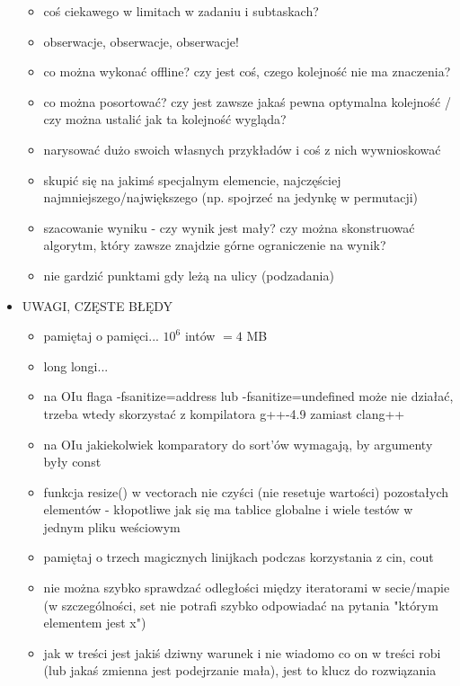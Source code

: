 \documentclass[15pt]{article}
\begin{document}
\begin{itemize}
\begin{itemize}
        \item coś ciekawego w limitach w zadaniu i subtaskach?
        \item obserwacje, obserwacje, obserwacje!
        \item co można wykonać offline? czy jest coś, czego kolejność nie ma znaczenia?
	    \item co można posortować? czy jest zawsze jakaś pewna optymalna kolejność / czy można ustalić jak ta kolejność wygląda?
        \item narysować dużo swoich własnych przykładów i coś z nich wywnioskować
    	\item skupić się na jakimś specjalnym elemencie, najczęściej najmniejszego/największego (np. spojrzeć na jedynkę w permutacji)
	    \item szacowanie wyniku - czy wynik jest mały? czy można skonstruować algorytm, który zawsze znajdzie górne ograniczenie na wynik?
        \item nie gardzić punktami gdy leżą na ulicy (podzadania)
    \end{itemize}
    
    \item UWAGI, CZĘSTE BŁĘDY
    \begin{itemize}
        \item pamiętaj o pamięci... $10^6$ intów $= 4$ MB 
        \item long longi...
        \item na OIu flaga -fsanitize=address lub -fsanitize=undefined może nie działać, trzeba wtedy skorzystać z kompilatora g++-4.9 zamiast clang++
        \item na OIu jakiekolwiek komparatory do sort'ów wymagają, by argumenty były const
        \item funkcja resize() w vectorach nie czyści (nie resetuje wartości) pozostałych elementów - kłopotliwe jak się ma tablice globalne i wiele testów w jednym pliku weściowym
        \item pamiętaj o trzech magicznych linijkach podczas korzystania z cin, cout
        \item nie można szybko sprawdzać odległości między iteratorami w secie/mapie (w szczególności, set nie potrafi szybko odpowiadać na pytania "którym elementem jest x")
        \item jak w treści jest jakiś dziwny warunek i nie wiadomo co on w treści robi (lub jakaś zmienna jest podejrzanie mała), jest to klucz do rozwiązania
    \end{itemize}
    

\end{itemize}
\end{document}
